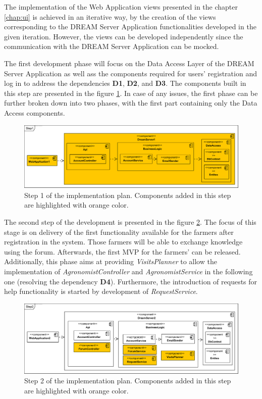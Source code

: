 The implementation of the Web Application views presented in the chapter \ref{chap:ui} is achieved in an iterative way, by the creation of the views corresponding to the DREAM Server Application functionalities developed in the given iteration. However, the views can be developed independently since the communication with the DREAM Server Application can be mocked. 

The first development phase will focus on the Data Access Layer of the DREAM Server Application as well ass the components required for users' registration and log in to address the dependencies \textbf{D1}, \textbf{D2}, and \textbf{D3}. The components built in this step are presented in the figure \ref{fig:step1}. In case of any issues, the first phase can be further broken down into two phases, with the first part containing only the Data Access components.

\begin{figure}[H]
    \centering
    \includegraphics[width=\textwidth]
    {diagrams/implementation-plan/Step1.png}
    \caption{Step 1 of the implementation plan. Components added in this step are highlighted with orange color.}
    \label{fig:step1}
\end{figure}

The second step of the development is presented in the figure \ref{fig:step2}. The focus of this stage is on delivery of the first functionality available for the farmers after registration in the system. Those farmers will be able to exchange knowledge using the forum.  Afterwards, the first MVP for the farmers' can be released. Additionally, this phase aims at providing \textit{VisitsPlanner} to allow the implementation of \textit{AgronomistController} and \textit{AgronomistService} in the following one (resolving the dependency \textbf{D4}). Furthermore, the introduction of requests for help functionality is started by development of \textit{RequestService}.

\begin{figure}[H]
    \centering
    \includegraphics[width=\textwidth]
    {diagrams/implementation-plan/Step2.png}
    \caption{Step 2 of the implementation plan. Components added in this step are highlighted with orange color.}
    \label{fig:step2}
\end{figure}

